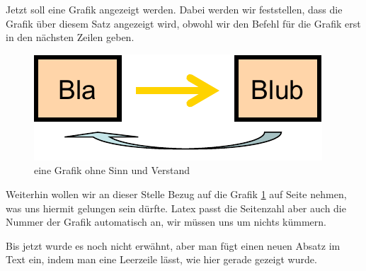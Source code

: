 \documentclass[a4paper, 11pt]{article}
\begin{document}
\listoffigures

\newpage

Jetzt soll eine Grafik angezeigt werden. Dabei werden wir feststellen, dass die
Grafik über diesem Satz angezeigt wird, obwohl wir den Befehl für die Grafik
erst in den nächsten Zeilen geben.
\begin{figure}
	\centering
	\includegraphics{grafik.pdf}
	\caption{eine Grafik ohne Sinn und Verstand}
	\label{img:grafik-dummy}
\end{figure}

\newpage

Weiterhin wollen wir an dieser Stelle Bezug auf die Grafik
\ref{img:grafik-dummy} auf Seite \pageref{img:grafik-dummy} nehmen, was uns
hiermit gelungen sein dürfte. Latex passt die Seitenzahl aber auch die Nummer
der Grafik automatisch an, wir müssen uns um nichts kümmern.

Bis jetzt wurde es noch nicht erwähnt, aber man fügt einen neuen Absatz im Text
ein, indem man eine Leerzeile lässt, wie hier gerade gezeigt wurde.

\end{document}
